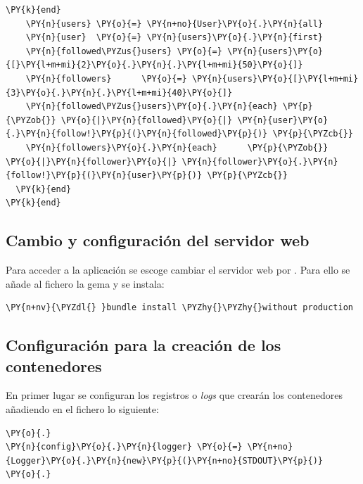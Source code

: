 \begin{codelisting}
\begin{Verbatim}[fontsize=\relsize{-2.5},fontseries=b,commandchars=\\\{\}]
	\PY{k}{end}  
	\PY{n}{users} \PY{o}{=} \PY{n+no}{User}\PY{o}{.}\PY{n}{all}
	\PY{n}{user}  \PY{o}{=} \PY{n}{users}\PY{o}{.}\PY{n}{first}
	\PY{n}{followed\PYZus{}users} \PY{o}{=} \PY{n}{users}\PY{o}{[}\PY{l+m+mi}{2}\PY{o}{.}\PY{n}{.}\PY{l+m+mi}{50}\PY{o}{]}
	\PY{n}{followers}      \PY{o}{=} \PY{n}{users}\PY{o}{[}\PY{l+m+mi}{3}\PY{o}{.}\PY{n}{.}\PY{l+m+mi}{40}\PY{o}{]}
	\PY{n}{followed\PYZus{}users}\PY{o}{.}\PY{n}{each} \PY{p}{\PYZob{}} \PY{o}{|}\PY{n}{followed}\PY{o}{|} \PY{n}{user}\PY{o}{.}\PY{n}{follow!}\PY{p}{(}\PY{n}{followed}\PY{p}{)} \PY{p}{\PYZcb{}}
	\PY{n}{followers}\PY{o}{.}\PY{n}{each}      \PY{p}{\PYZob{}} \PY{o}{|}\PY{n}{follower}\PY{o}{|} \PY{n}{follower}\PY{o}{.}\PY{n}{follow!}\PY{p}{(}\PY{n}{user}\PY{p}{)} \PY{p}{\PYZcb{}}
  \PY{k}{end}
\PY{k}{end}
\end{Verbatim}
\end{codelisting}

\subsection{Cambio y configuración del servidor web}

Para acceder a la aplicación se escoge cambiar el servidor web  por . Para ello se añade al fichero  la gema  y se instala: 

\begin{framed_shaded}
\begin{Verbatim}[fontsize=\relsize{-2.5},fontseries=b,commandchars=\\\{\}]
\PY{n+nv}{\PYZdl{} }bundle install \PYZhy{}\PYZhy{}without production
\end{Verbatim}
\end{framed_shaded}

\subsection{Configuración para la creación de los contenedores}

En primer lugar se configuran los registros o \textit{logs} que crearán los contenedores añadiendo en el fichero  lo siguiente:

\begin{codelisting}
\label{code:application.rb}
\begin{Verbatim}[fontsize=\relsize{-2.5},fontseries=b,commandchars=\\\{\}]
\PY{o}{.}
\PY{n}{config}\PY{o}{.}\PY{n}{logger} \PY{o}{=} \PY{n+no}{Logger}\PY{o}{.}\PY{n}{new}\PY{p}{(}\PY{n+no}{STDOUT}\PY{p}{)}
\PY{o}{.}
\end{Verbatim}
\end{codelisting}

